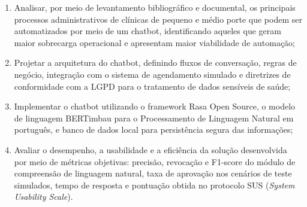 \documentclass[12pt,a4paper]{extarticle}
\begin{document}

\begin{enumerate}
    \item Analisar, por meio de levantamento bibliográfico e documental, os principais processos administrativos de clínicas de pequeno e médio porte que podem ser automatizados por meio de um chatbot, identificando aqueles que geram maior sobrecarga operacional e apresentam maior viabilidade de automação;
    \item Projetar a arquitetura do chatbot, definindo fluxos de conversação, regras de negócio, integração com o sistema de agendamento simulado e diretrizes de conformidade com a LGPD para o tratamento de dados sensíveis de saúde;
    \item Implementar o chatbot utilizando o framework Rasa Open Source, o modelo de linguagem BERTimbau para o Processamento de Linguagem Natural em português, e banco de dados local para persistência segura das informações;
    \item Avaliar o desempenho, a usabilidade e a eficiência da solução desenvolvida por meio de métricas objetivas: precisão, revocação e F1-score do módulo de compreensão de linguagem natural, taxa de aprovação nos cenários de teste simulados, tempo de resposta e pontuação obtida no protocolo SUS (\textit{System Usability Scale}).
\end{enumerate}
\end{document}
